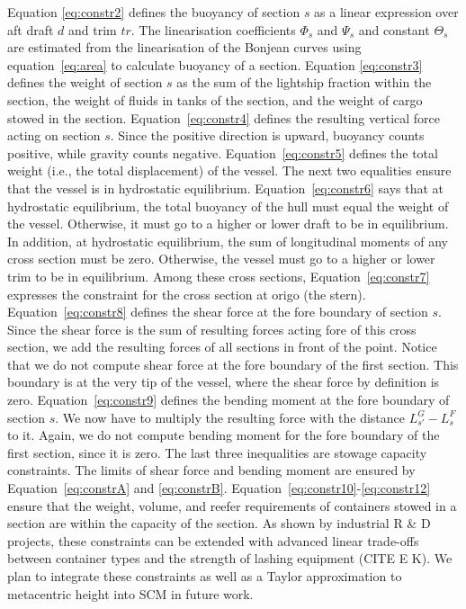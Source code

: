 \documentclass[runningheads]{llncs}
\begin{document}
Equation \eqref{eq:constr2} defines the buoyancy of section $s$ as a linear expression over aft draft $d$ and trim  $\mathit{tr}$. The linearisation coefficients $\Phi_s$ and $\Psi_s$ and constant $\Theta_s$ are estimated from the linearisation of the Bonjean curves using equation~\eqref{eq:area} to calculate buoyancy of a section. Equation \eqref{eq:constr3} defines the weight of section $s$ as the sum of the lightship fraction within the section, the weight of fluids in tanks of the section, and the weight of cargo stowed in the section. Equation~\eqref{eq:constr4} defines the resulting vertical force acting on section $s$. Since the positive direction is upward, buoyancy counts positive, while gravity counts negative. Equation~\eqref{eq:constr5} defines the total weight (i.e., the total displacement) of the vessel. The next two equalities ensure that the vessel is in hydrostatic equilibrium. Equation~\eqref{eq:constr6} says that at hydrostatic equilibrium, the total buoyancy of the hull must equal the weight of the vessel. Otherwise, it must go to a higher or lower draft to be in equilibrium. In addition, at hydrostatic equilibrium, the sum of longitudinal moments of any cross section must be zero. Otherwise, the vessel must go to a higher or lower trim to be in equilibrium. Among these cross sections, Equation~\eqref{eq:constr7} expresses the constraint for the cross section at origo (the stern). Equation~\eqref{eq:constr8} defines the shear force at the fore boundary of section $s$. Since the shear force is the sum of resulting forces acting fore of this cross section, we add the resulting forces of all sections in front of the point. Notice that we do not compute shear force at the fore boundary of the first section. This boundary is at the very tip of the vessel, where the shear force by definition is zero. Equation~\eqref{eq:constr9} defines the bending moment at the fore boundary of section $s$. We now have to multiply the resulting force with the distance $L^G_{s'} - L^F_s$ to it. Again, we do not compute bending moment for the fore boundary of the first section, since it is zero. The last three inequalities are stowage capacity constraints. The limits of shear force and bending moment are ensured by Equation~\eqref{eq:constrA} and \eqref{eq:constrB}. Equation~\eqref{eq:constr10}-\eqref{eq:constr12} ensure that the weight, volume, and reefer requirements of containers stowed in a section are within the capacity of the section. As shown by industrial R \& D projects, these constraints can be extended with advanced linear trade-offs  between container types and the strength of lashing  equipment (CITE E K). We plan to integrate these constraints as well as a Taylor approximation to metacentric height into SCM in future work.
 
\end{document}
